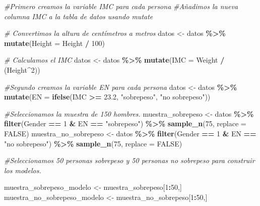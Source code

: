 \documentclass[
]{article}
\newenvironment{Shaded}{\begin{snugshade}}{\end{snugshade}}
\newcommand{\AttributeTok}[1]{\textcolor[rgb]{0.13,0.29,0.53}{#1}}
\newcommand{\CommentTok}[1]{\textcolor[rgb]{0.56,0.35,0.01}{\textit{#1}}}
\newcommand{\ConstantTok}[1]{\textcolor[rgb]{0.56,0.35,0.01}{#1}}
\newcommand{\DecValTok}[1]{\textcolor[rgb]{0.00,0.00,0.81}{#1}}
\newcommand{\FloatTok}[1]{\textcolor[rgb]{0.00,0.00,0.81}{#1}}
\newcommand{\FunctionTok}[1]{\textcolor[rgb]{0.13,0.29,0.53}{\textbf{#1}}}
\newcommand{\NormalTok}[1]{#1}
\newcommand{\OtherTok}[1]{\textcolor[rgb]{0.56,0.35,0.01}{#1}}
\newcommand{\SpecialCharTok}[1]{\textcolor[rgb]{0.81,0.36,0.00}{\textbf{#1}}}
\newcommand{\StringTok}[1]{\textcolor[rgb]{0.31,0.60,0.02}{#1}}
\begin{document}
\begin{Shaded}
\begin{Highlighting}[]
\CommentTok{\#Primero creamos la variable IMC para cada persona}
\CommentTok{\#Añadimos la nueva columna IMC a la tabla de datos usando mutate}

\CommentTok{\# Convertimos la altura de centímetros a metros}
\NormalTok{datos }\OtherTok{\textless{}{-}}\NormalTok{ datos }\SpecialCharTok{\%\textgreater{}\%} \FunctionTok{mutate}\NormalTok{(}\AttributeTok{Height =}\NormalTok{ Height }\SpecialCharTok{/} \DecValTok{100}\NormalTok{)}

\CommentTok{\# Calculamos el IMC }
\NormalTok{datos }\OtherTok{\textless{}{-}}\NormalTok{ datos }\SpecialCharTok{\%\textgreater{}\%} \FunctionTok{mutate}\NormalTok{(}\AttributeTok{IMC =}\NormalTok{ Weight }\SpecialCharTok{/}\NormalTok{ (Height}\SpecialCharTok{\^{}}\DecValTok{2}\NormalTok{))}

\CommentTok{\#Segundo creamos la variable EN para cada persona}
\NormalTok{datos }\OtherTok{\textless{}{-}}\NormalTok{ datos }\SpecialCharTok{\%\textgreater{}\%} \FunctionTok{mutate}\NormalTok{(}\AttributeTok{EN =} \FunctionTok{ifelse}\NormalTok{(IMC }\SpecialCharTok{\textgreater{}=} \FloatTok{23.2}\NormalTok{, }\StringTok{"sobrepeso"}\NormalTok{, }\StringTok{"no sobrepeso"}\NormalTok{))}

\CommentTok{\#Seleccionamos la muestra de 150 hombres.}
\NormalTok{muestra\_sobrepeso }\OtherTok{\textless{}{-}}\NormalTok{ datos }\SpecialCharTok{\%\textgreater{}\%} \FunctionTok{filter}\NormalTok{(Gender }\SpecialCharTok{==} \DecValTok{1} \SpecialCharTok{\&}\NormalTok{ EN }\SpecialCharTok{==} \StringTok{"sobrepeso"}\NormalTok{) }\SpecialCharTok{\%\textgreater{}\%} \FunctionTok{sample\_n}\NormalTok{(}\DecValTok{75}\NormalTok{, }\AttributeTok{replace =} \ConstantTok{FALSE}\NormalTok{)}
\NormalTok{muestra\_no\_sobrepeso }\OtherTok{\textless{}{-}}\NormalTok{ datos }\SpecialCharTok{\%\textgreater{}\%} \FunctionTok{filter}\NormalTok{(Gender }\SpecialCharTok{==} \DecValTok{1} \SpecialCharTok{\&}\NormalTok{ EN }\SpecialCharTok{==} \StringTok{"no sobrepeso"}\NormalTok{) }\SpecialCharTok{\%\textgreater{}\%} \FunctionTok{sample\_n}\NormalTok{(}\DecValTok{75}\NormalTok{, }\AttributeTok{replace =} \ConstantTok{FALSE}\NormalTok{)}

\CommentTok{\#Seleccionamos 50 personas sobrepeso y 50 personas no sobrepeso para construir los modelos. }

\NormalTok{muestra\_sobrepeso\_modelo }\OtherTok{\textless{}{-}}\NormalTok{ muestra\_sobrepeso[}\DecValTok{1}\SpecialCharTok{:}\DecValTok{50}\NormalTok{,]}
\NormalTok{muestra\_no\_sobrepeso\_modelo }\OtherTok{\textless{}{-}}\NormalTok{ muestra\_no\_sobrepeso[}\DecValTok{1}\SpecialCharTok{:}\DecValTok{50}\NormalTok{,]}


\end{Highlighting}
\end{Shaded}
\end{document}
